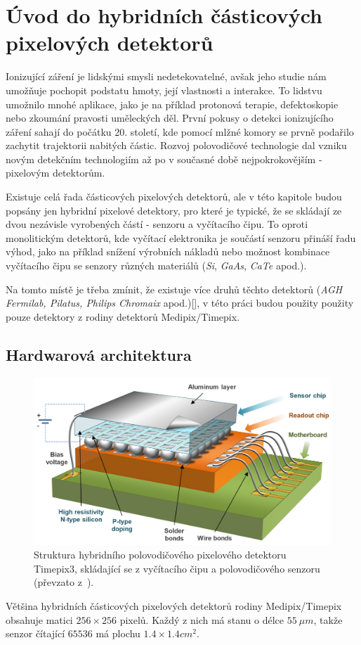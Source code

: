 

\chapter{Úvod do hybridních částicových pixelových detektorů}\label{chap:detectors}
Ionizující záření je lidskými smysli nedetekovatelné, avšak jeho studie nám umožňuje pochopit podstatu hmoty, její vlastnosti a interakce. To lidstvu umožnilo mnohé aplikace, jako je na příklad protonová terapie, defektoskopie nebo zkoumání pravosti uměleckých děl. První pokusy o detekci ionizujícího záření sahají do počátku 20. století, kde pomocí mlžné komory se prvně podařilo zachytit trajektorii nabitých částic. Rozvoj polovodičové technologie dal vzniku novým detekčním technologiím až po v současné době nejpokrokovějším - pixelovým detektorům.

Existuje celá řada částicových pixelových detektorů, ale v této kapitole budou popsány jen hybridní pixelové detektory, pro které je typické, že se skládají ze dvou nezávisle vyrobených částí - senzoru a vyčítacího čipu. To oproti monolitickým detektorů, kde vyčítací elektronika je součástí senzoru přináší řadu výhod, jako na příklad snížení výrobních nákladů nebo možnost kombinace vyčítacího čipu se senzory různých materiálů (\textit{Si}, \textit{GaAs}, \textit{CaTe} apod.).

Na tomto místě je třeba zmínit, že existuje více druhů těchto detektorů (\textit{AGH Fermilab, Pilatus, Philips Chromaix} apod.)[\cite{detectors_review}], v této práci budou použity použity pouze detektory z rodiny detektorů Medipix/Timepix.


\section{Hardwarová architektura}
\begin{figure}[th]
	\begin{center}
		\includegraphics[width=12cm]{figures/det_chip.png}
		\caption{Struktura hybridního polovodičového pixelového detektoru Timepix3, skládající se z vyčítacího čipu a polovodičového senzoru (převzato z~\cite{PlatkevicDisertace}).}
		\label{fig:det:chip}
	\end{center}
\end{figure}
Většina hybridních částicových pixelových detektorů rodiny Medipix/Timepix obsahuje matici $256\times256$ pixelů. Každý z nich má stanu o délce $55~\mu m$, takže senzor čítající $65536$ má plochu $1.4 \times 1.4 cm^2$.